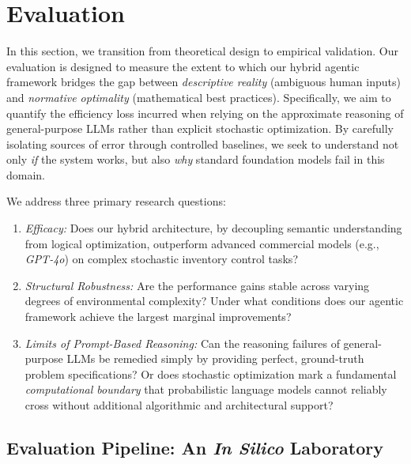 \section{Evaluation}\label{sec:eval}



In this section, we transition from theoretical design to empirical validation. Our evaluation is designed to measure the extent to which our hybrid agentic framework bridges the gap between \emph{descriptive reality} (ambiguous human inputs) and \emph{normative optimality} (mathematical best practices). Specifically, we aim to quantify the efficiency loss incurred when relying on the approximate reasoning of general-purpose LLMs rather than explicit stochastic optimization. By carefully isolating sources of error through controlled baselines, we seek to understand not only \emph{if} the system works, but also \emph{why} standard foundation models fail in this domain.


We address three primary research questions:

\begin{enumerate} 
\item \emph{Efficacy:} Does our hybrid architecture, by decoupling semantic understanding from logical optimization, outperform advanced commercial models (e.g., \emph{GPT-4o}) on complex stochastic inventory control tasks?

\item \emph{Structural Robustness:} Are the performance gains stable across varying degrees of environmental complexity? Under what conditions does our agentic framework achieve the largest marginal improvements?

\item \emph{Limits of Prompt-Based Reasoning:} Can the reasoning failures of general-purpose LLMs be remedied simply by providing perfect, ground-truth problem specifications? Or does stochastic optimization mark a fundamental \emph{computational boundary} that probabilistic language models cannot reliably cross without additional algorithmic and architectural support?

\end{enumerate}



\subsection{Evaluation Pipeline: An \textit{In Silico} Laboratory}


